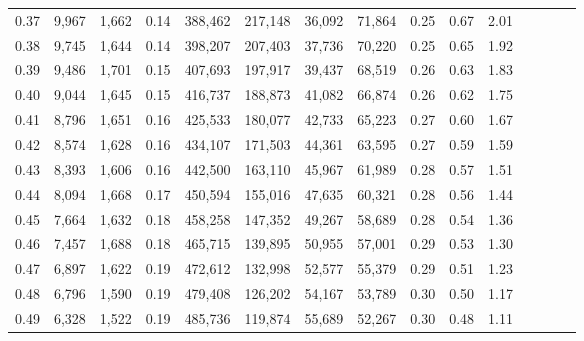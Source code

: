 \begin{tabular}{rrrcrrrrrrrrrrr}
0.37 &   9,967 &  1,662 &                                       0.14 &  388,462 &  217,148 &   36,092 &   71,864 &  0.25 &  0.67 &                         2.01 \\
0.38 &   9,745 &  1,644 &                                       0.14 &  398,207 &  207,403 &   37,736 &   70,220 &  0.25 &  0.65 &                         1.92 \\
0.39 &   9,486 &  1,701 &                                       0.15 &  407,693 &  197,917 &   39,437 &   68,519 &  0.26 &  0.63 &                         1.83 \\
0.40 &   9,044 &  1,645 &                                       0.15 &  416,737 &  188,873 &   41,082 &   66,874 &  0.26 &  0.62 &                         1.75 \\
0.41 &   8,796 &  1,651 &                                       0.16 &  425,533 &  180,077 &   42,733 &   65,223 &  0.27 &  0.60 &                         1.67 \\
0.42 &   8,574 &  1,628 &                                       0.16 &  434,107 &  171,503 &   44,361 &   63,595 &  0.27 &  0.59 &                         1.59 \\
0.43 &   8,393 &  1,606 &                                       0.16 &  442,500 &  163,110 &   45,967 &   61,989 &  0.28 &  0.57 &                         1.51 \\
0.44 &   8,094 &  1,668 &                                       0.17 &  450,594 &  155,016 &   47,635 &   60,321 &  0.28 &  0.56 &                         1.44 \\
0.45 &   7,664 &  1,632 &                                       0.18 &  458,258 &  147,352 &   49,267 &   58,689 &  0.28 &  0.54 &                         1.36 \\
0.46 &   7,457 &  1,688 &                                       0.18 &  465,715 &  139,895 &   50,955 &   57,001 &  0.29 &  0.53 &                         1.30 \\
0.47 &   6,897 &  1,622 &                                       0.19 &  472,612 &  132,998 &   52,577 &   55,379 &  0.29 &  0.51 &                         1.23 \\
0.48 &   6,796 &  1,590 &                                       0.19 &  479,408 &  126,202 &   54,167 &   53,789 &  0.30 &  0.50 &                         1.17 \\
0.49 &   6,328 &  1,522 &                                       0.19 &  485,736 &  119,874 &   55,689 &   52,267 &  0.30 &  0.48 &                         1.11 \\

\end{tabular}
